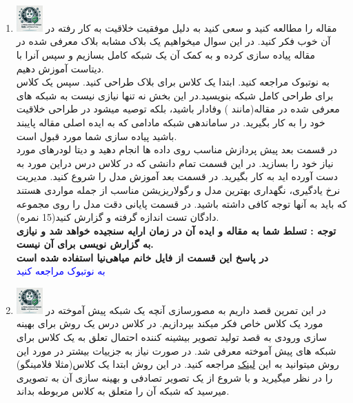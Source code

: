 \documentclass[12pt]{article}
\begin{document}
\begin{enumerate}
    \item \includegraphics[width=1cm]{figs/Allowed_recommended.jpg}
    مقاله \href{https://arxiv.org/pdf/1611.05431}{} را مطالعه کنید و سعی کنید به دلیل موفقیت خلاقیت به کار رفته در آن خوب فکر کنید. در این سوال میخواهیم یک بلاک مشابه بلاک معرفی شده در مقاله پیاده سازی کرده و به کمک آن یک شبکه کامل بسازیم و سپس آنرا با دیتاست  آموزش دهیم.\\
    به نوتبوک  مراجعه کنید. ابتدا یک کلاس برای بلاک  طراحی کنید. سپس یک کلاس برای طراحی کامل شبکه بنویسید.در این بخش نه تنها نیازی نیست به شبکه های معرفی شده در مقاله(مانند ) وفادار باشید، بلکه توصیه میشود در طراحی خلاقیت خود را به کار بگیرید. در ساماندهی شبکه مادامی که به ایده اصلی مقاله پایبند باشید پیاده سازی شما مورد قبول است.\\
    در قسمت بعد پیش پردازش مناسب روی داده ها انجام دهید و دیتا لودرهای مورد نیاز خود را بسازید. در این قسمت تمام دانشی که در کلاس درس دراین مورد به دست آورده اید به کار بگیرید. در قسمت بعد آموزش مدل را شروع کنید. مدیریت نرخ یادگیری، نگهداری بهترین مدل و رگولاریزیشن مناسب از جمله مواردی هستند که باید به آنها توجه کافی داشته باشید. در قسمت پایانی دقت مدل را روی مجموعه دادگان تست اندازه گرفته و گزارش کنید(15 نمره).\\
    \textbf{توجه : تسلط شما به مقاله و ایده آن در زمان ارایه سنجیده خواهد شد و نیازی به گزارش نویسی برای آن نیست.}\\
    \textbf{در پاسخ این قسمت از فایل خانم میاهی‌نیا استفاده شده است}\\
    \textcolor{blue}{
    به نوتبوک  مراجعه کنید
    }
    \item \includegraphics[width=1cm]{figs/Allowed_recommended.jpg}
    در این تمرین قصد داریم به مصورسازی آنچه یک شبکه پیش آموخته در مورد یک کلاس خاص فکر میکند بپردازیم. در کلاس درس یک روش برای بهینه سازی ورودی به قصد تولید تصویر بیشینه کننده احتمال تعلق به یک کلاس برای شبکه های پیش آموخته معرفی شد. در صورت نیاز به جزییات بیشتر در مورد این روش میتوانید به این \href{https://yosinski.com/deepvis}{لینک} مراجعه کنید. در این روش ابتدا یک کلاس(مثلا فلامینگو) را در نظر میگیرید و با شروع از یک تصویر تصادفی و بهینه سازی آن به تصویری میرسید که شبکه آن را متعلق به کلاس مربوطه بداند.\\

\end{enumerate}
\end{document}
